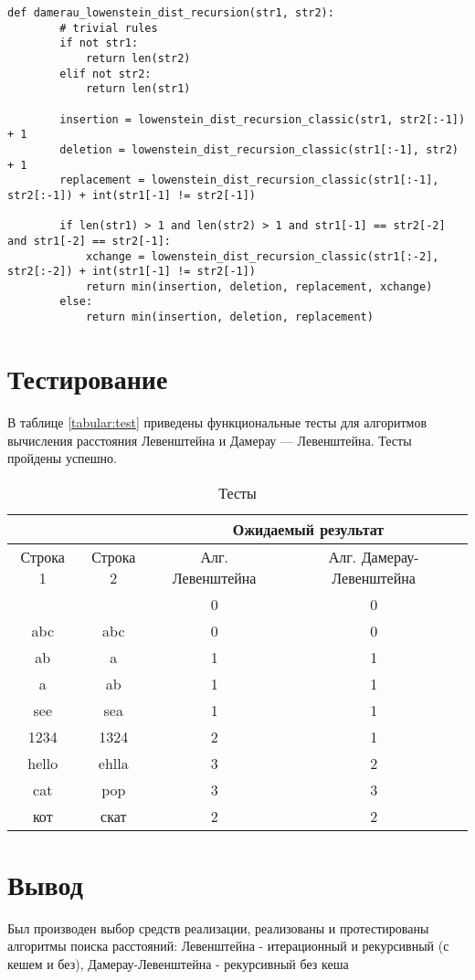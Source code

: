 \begin{lstlisting}[caption=Функция рекурсивного алгоритма поиска расстояния Дамерау-Левенштейна,
	label={dlev_recursion}]
	def damerau_lowenstein_dist_recursion(str1, str2):
		# trivial rules
		if not str1:
			return len(str2)
		elif not str2:
			return len(str1)
		
		insertion = lowenstein_dist_recursion_classic(str1, str2[:-1]) + 1
		deletion = lowenstein_dist_recursion_classic(str1[:-1], str2) + 1
		replacement = lowenstein_dist_recursion_classic(str1[:-1], str2[:-1]) + int(str1[-1] != str2[-1])
		
		if len(str1) > 1 and len(str2) > 1 and str1[-1] == str2[-2] and str1[-2] == str2[-1]:
			xchange = lowenstein_dist_recursion_classic(str1[:-2], str2[:-2]) + int(str1[-1] != str2[-1])
			return min(insertion, deletion, replacement, xchange)
		else:
			return min(insertion, deletion, replacement)
\end{lstlisting}

\section{Тестирование}

В таблице \ref{tabular:test} приведены функциональные тесты для алгоритмов вычисления расстояния Левенштейна и Дамерау — Левенштейна. Тесты пройдены успешно.

\begin{table}[h]
	\begin{center}
		\caption{\label{test} Тесты}
		\begin{tabular}{|c|c|c|c|}
			\hline
			&                    & \multicolumn{2}{c|}{\bfseries Ожидаемый результат}    \\ \cline{3-4}\hline
			Строка 1& Строка 2 & Алг. Левенштейна & Алг. Дамерау-Левенштейна \\ [0.5ex] 
			\hline
			 &  & 0 & 0\\
			\hline
			abc & abc & 0 & 0\\
			\hline
			ab & a & 1 & 1\\
			\hline
			a & ab & 1 & 1\\
			\hline
			see & sea & 1 & 1\\
			\hline
			1234 & 1324 & 2 & 1\\
			\hline
			hello & ehlla & 3 & 2\\
			\hline
			cat & pop & 3 & 3\\
			\hline
			кот & скат & 2 & 2\\
			\hline
		\end{tabular}
	\end{center}
\end{table}


\section*{Вывод}

Был производен выбор средств реализации, реализованы и протестированы алгоритмы поиска расстояний: Левенштейна - итерационный и рекурсивный (с кешем и без), Дамерау-Левенштейна - рекурсивный без кеша
